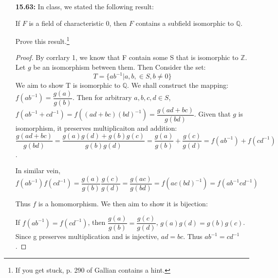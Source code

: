 \documentclass[11pt, oneside]{article}
\newcommand{\Z}{\mathbb Z}
\newcommand{\Q}{\mathbb Q}
\begin{document}
\begin{enumerate}
\begin{proof}
Set additive inverse of $a/b$ to be $-a/b$ since $a/b+-a/b=(ab-ab)/b^2\equiv 0/1$ given that $0*1=0*b^2$. 

Set $1/1$ to be the multiplicative inverse since $(a/b)(1/1)=a/b=(1/1)(a/b)$. 

Set the multiplicative inverse of a nonzero element $a/b$ to $b/a$ since $(a/b)(b/a)=ab/ba $ and we have $(ab,ba)\equiv (1,1)$ since $ab=ba$ and D is commutative. 

Then define the mapping $\varphi: D\rightarrow F: \varphi(x)=x/1$. We aim to show that it is a ring isomorphism from $D to \varphi(D)$. Since for arbitrary $x,y\in D$, we have $\varphi(x+y)=(x+y)/1=x/1+y/1=\varphi(x)+\varphi(y)$ and $\varphi(xy)=(xy)/1=(x/1)(y/1)$ by our construction. It is hereby a ring homeomorphism. It is surjective since the taget space is $\varphi(D)$. It is also injective since each $x\in D$ is uniquely defined and also $x/1$ in $\varphi(D)$. Thus we have found our isomorphism.
\end{proof}

\newpage
\item[{\bf 15.63:}] In class, we stated the following result: 

 If $F$ is a field of characteristic $0$, then $F$ contains a subfield isomorphic to $\Q$.

Prove this result.\footnote{If you get stuck, p. 290 of Gallian contains a hint.}
\begin{proof}
By corrlary 1, we know that F contain some S that is isomorphic to $\Z$. Let $g$ be an isomorphism between them. Then Consider the set:
\[T=\{ab^{-1}|a,b,\in S, b\neq 0\}\]
We aim to show T is isomorphic to $\Q$. We shall construct the mapping: $f(ab^{-1})=\dfrac{g(a)}{g(b)}$. Then for arbitrary $a,b,c,d \in S$, $f(ab^{-1}+cd^{-1})=f((ad+bc)(bd)^{-1})=\dfrac{g(ad+bc)}{g(bd)}$. Given that $g$ is isomorphism, it preserves multiplicaiton and addition: $\dfrac{g(ad+bc)}{g(bd)}=\dfrac{g(a)g(d)+g(b)g(c)}{g(b)g(d)}=\dfrac{g(a)}{g(b)}+\dfrac{g(c)}{g(d)}=f(ab^{-1})+f(cd^{-1})$. 

In similar vein, $f(ab^{-1})f(cd^{-1})=\dfrac{g(a)}{g(b)} \dfrac{g(c)}{g(d)}=\dfrac{g(ac)}{g(bd)}=f(ac(bd)^{-1})=f(ab^{-1}cd^{-1})$

Thus $f$ is a homomorphism. We then aim to show it is bijection:

If $f(ab^{-1})=f(cd^{-1})$, then $\dfrac{g(a)}{g(b)}=\dfrac{g(c)}{g(d)}$, $g(a)g(d)=g(b)g(c)$. Since g preserves multiplication and is injective, $ad=bc$. Thus $ab^{-1}=cd^{-1}$.


\end{proof}
\end{enumerate}
\end{document}
